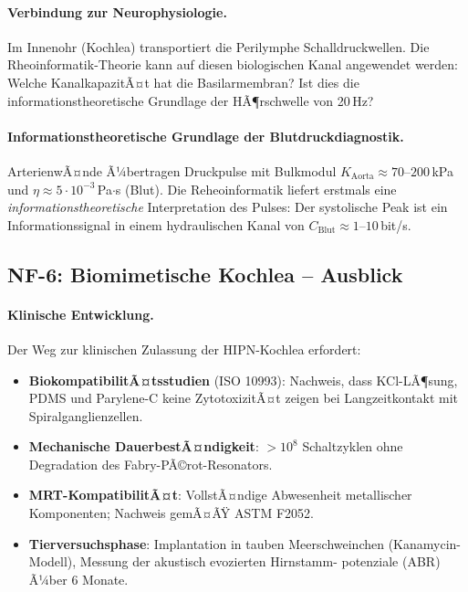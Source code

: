 ﻿\documentclass[a4paper,12pt]{scrreprt}
\theoremstyle{definition}
\begin{document}
\paragraph{Verbindung zur Neurophysiologie.}
Im Innenohr (Kochlea) transportiert die Perilymphe Schalldruckwellen.
Die Rheoinformatik-Theorie kann auf diesen biologischen Kanal angewendet werden:
Welche KanalkapazitÃ¤t hat die Basilarmembran? Ist dies die informationstheoretische
Grundlage der HÃ¶rschwelle von 20\,Hz?

\paragraph{Informationstheoretische Grundlage der Blutdruckdiagnostik.}
ArterienwÃ¤nde Ã¼bertragen Druckpulse mit Bulkmodul
$K_\mathrm{Aorta} \approx 70$--$200$\,kPa und
$\eta \approx 5 \cdot 10^{-3}$\,Pa$\cdot$s (Blut). Die
Reheoinformatik liefert erstmals eine \emph{informationstheoretische}
Interpretation des Pulses: Der systolische Peak ist ein
Informationssignal in einem hydraulischen Kanal von
$C_\mathrm{Blut} \approx 1$--$10$\,bit/s.

\subsection*{NF-6: Biomimetische Kochlea -- Ausblick}

\paragraph{Klinische Entwicklung.}
Der Weg zur klinischen Zulassung der HIPN-Kochlea erfordert:
\begin{itemize}
  \item \textbf{BiokompatibilitÃ¤tsstudien} (ISO 10993): Nachweis,
    dass KCl-LÃ¶sung, PDMS und Parylene-C keine ZytotoxizitÃ¤t
    zeigen bei Langzeitkontakt mit Spiralganglienzellen.
  \item \textbf{Mechanische DauerbestÃ¤ndigkeit}: $> 10^8$
    Schaltzyklen ohne Degradation des Fabry-PÃ©rot-Resonators.
  \item \textbf{MRT-KompatibilitÃ¤t}: VollstÃ¤ndige Abwesenheit
    metallischer Komponenten; Nachweis gemÃ¤ÃŸ ASTM F2052.
  \item \textbf{Tierversuchsphase}: Implantation in tauben Meerschweinchen
    (Kanamycin-Modell), Messung der akustisch evozierten Hirnstamm-
    potenziale (ABR) Ã¼ber 6 Monate.
\end{itemize}
\end{document}
